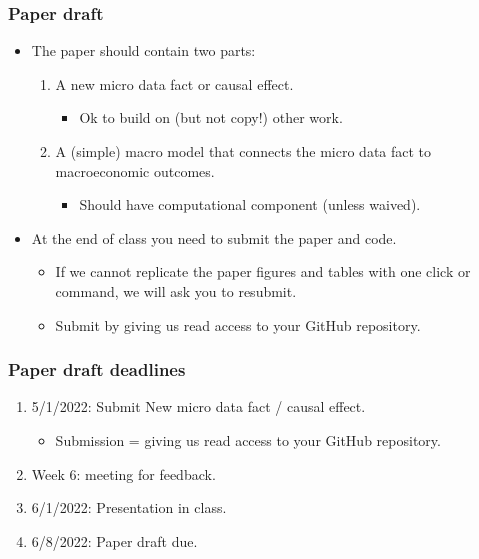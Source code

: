 \documentclass[english,xcolor=svgnames]{beamer}
\begin{document}
\begin{frame}
\frametitle[alignment=center]{Paper draft}
\begin{itemize}
	\item The paper should contain two parts:
	\begin{enumerate}
		\item A new micro data fact or causal effect.
		\begin{itemize}
			\item Ok to build on (but not copy!) other work.
		\end{itemize}
		\item A (simple) macro model that connects the micro data fact to macroeconomic outcomes.
		\begin{itemize}
			\item Should have computational component (unless waived).
		\end{itemize}
	\end{enumerate}
	\item At the end of class you need to submit the paper and code.
	\begin{itemize}
		\item If we cannot replicate the paper figures and tables with one click or command, we will ask you to resubmit.
		\item Submit by giving us read access to your GitHub repository.
	\end{itemize}
\end{itemize}
\end{frame}


\begin{frame}
\frametitle[alignment=center]{Paper draft deadlines}
\begin{enumerate}
	\item 5/1/2022: Submit New micro data fact / causal effect. 
	\begin{itemize}
		\item Submission = giving us read access to your GitHub repository.
	\end{itemize}
	\item Week 6: meeting for feedback.
	\item 6/1/2022: Presentation in class.
	\item 6/8/2022: Paper draft due.
\end{enumerate}
\end{frame}
\end{document}
